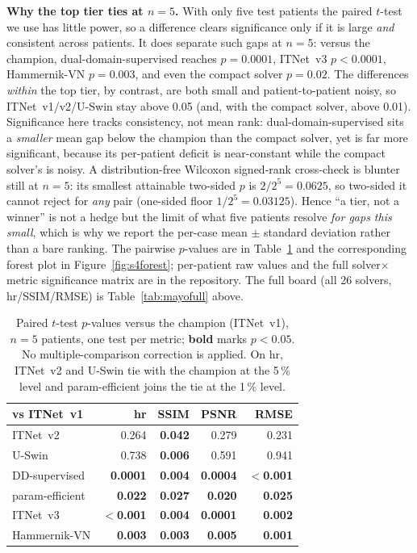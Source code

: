 \documentclass[AMA,twocolumn]{USG}
\begin{document}
\textbf{Why the top tier ties at $n=5$.} With only five test patients the paired $t$-test we use has little power, so a difference clears significance only if it is large \emph{and} consistent across patients. It does separate such gaps at $n=5$: versus the champion, dual-domain-supervised reaches $p=0.0001$, ITNet~v3 $p<0.0001$, Hammernik-VN $p=0.003$, and even the compact solver $p=0.02$. The differences \emph{within} the top tier, by contrast, are both small and patient-to-patient noisy, so ITNet~v1/v2/U-Swin stay above 0.05 (and, with the compact solver, above 0.01). Significance here tracks consistency, not mean rank: dual-domain-supervised sits a \emph{smaller} mean gap below the champion than the compact solver, yet is far more significant, because its per-patient deficit is near-constant while the compact solver's is noisy. A distribution-free Wilcoxon signed-rank cross-check is blunter still at $n=5$: its smallest attainable two-sided $p$ is $2/2^5=0.0625$, so two-sided it cannot reject for \emph{any} pair (one-sided floor $1/2^5=0.03125$). Hence ``a tier, not a winner'' is not a hedge but the limit of what five patients resolve \emph{for gaps this small}, which is why we report the per-case mean $\pm$ standard deviation rather than a bare ranking. The pairwise $p$-values are in Table~\ref{tab:s4pvals} and the corresponding forest plot in Figure~\ref{fig:s4forest}; per-patient raw values and the full solver$\times$metric significance matrix are in the repository. The full board (all 26 solvers, hr/SSIM/RMSE) is Table~\ref{tab:mayofull} above.

\begin{table}[tbp]
\caption{Paired $t$-test $p$-values versus the champion (ITNet~v1), $n=5$ patients, one test per metric; \textbf{bold} marks $p<0.05$. No multiple-comparison correction is applied. On hr, ITNet~v2 and U-Swin tie with the champion at the 5\,\% level and param-efficient joins the tie at the 1\,\% level.\label{tab:s4pvals}}
\centering
\footnotesize
\setlength{\tabcolsep}{5pt}
\begin{tabular}{@{}lrrrr@{}}
\toprule
\textbf{vs ITNet~v1} & \textbf{hr} & \textbf{SSIM} & \textbf{PSNR} & \textbf{RMSE} \\
\midrule
ITNet~v2         & 0.264 & \textbf{0.042} & 0.279 & 0.231 \\
U-Swin           & 0.738 & \textbf{0.006} & 0.591 & 0.941 \\
DD-supervised    & \textbf{0.0001} & \textbf{0.004} & \textbf{0.0004} & \textbf{$<$0.001} \\
param-efficient  & \textbf{0.022} & \textbf{0.027} & \textbf{0.020} & \textbf{0.025} \\
ITNet~v3         & \textbf{$<$0.001} & \textbf{0.004} & \textbf{0.0001} & \textbf{0.002} \\
Hammernik-VN     & \textbf{0.003} & \textbf{0.003} & \textbf{0.005} & \textbf{0.001} \\
\bottomrule
\end{tabular}
\end{table}
\end{document}

